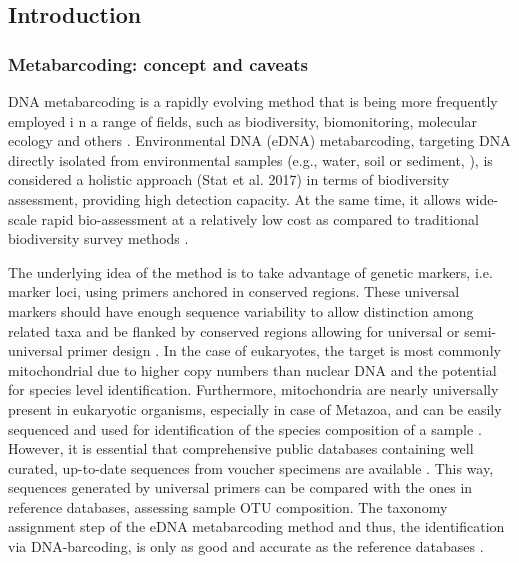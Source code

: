    \subsection{Introduction}
   \label{sec:darn-intro}

   \subsubsection*{Metabarcoding: concept and caveats}
   \label{subsec:darn-intro-metabar}

   DNA metabarcoding is a rapidly evolving method that is being more frequently employed i
   n a range of fields, such as biodiversity, biomonitoring, molecular ecology and others 
   \citep{deiner2017environmental, ruppert2019past}. 
   Environmental DNA (eDNA) metabarcoding, targeting DNA directly isolated from environmental samples
   (e.g., water, soil or sediment, \citep{taberlet_environmental_2012}), is considered a holistic approach 
   (Stat et al. 2017) in terms of biodiversity assessment, providing high detection capacity. 
   At the same time, it allows wide-scale rapid bio-assessment \citep{stat2017ecosystem} at a relatively
   low cost as compared to traditional biodiversity survey methods \citep{ji2013reliable}.

   The underlying idea of the method is to take advantage of genetic markers, i.e. marker loci, 
   using primers anchored in conserved regions. 
   These universal markers should have enough sequence variability to allow distinction among 
   related taxa and be flanked by conserved regions allowing for universal or semi-universal primer design \citep{deagle2014dna}. 
   In the case of eukaryotes, the target is most commonly mitochondrial due to higher copy numbers than nuclear DNA and the potential for species level identification. 
   Furthermore, mitochondria are nearly universally present in eukaryotic organisms, especially in case of Metazoa, and can be easily sequenced and used for identification of the species composition of a sample \citep{taberlet2012towards}. 
   However, it is essential that comprehensive public databases containing well curated, up-to-date sequences from voucher specimens are available \citep{schenekar2020reference}. 
   This way, sequences generated by universal primers can be compared with the ones in reference databases, assessing sample OTU composition. 
   The taxonomy assignment step of the eDNA metabarcoding method and thus, the identification via DNA-barcoding, is only as good and accurate as the reference databases \citep{cilleros2019unlocking}. 

